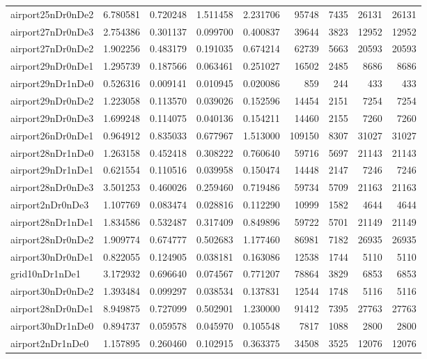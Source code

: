 \documentclass[../../../thesis.tex]{subfiles}
\begin{document}
\begin{longtable}{|l|r|r|r|r|r|r|r|r|}
airport25nDr0nDe2 & 6.780581 & 0.720248 & 1.511458 & 2.231706 & 95748 & 7435 & 26131 & 26131 \\
airport27nDr0nDe3 & 2.754386 & 0.301137 & 0.099700 & 0.400837 & 39644 & 3823 & 12952 & 12952 \\
airport27nDr0nDe2 & 1.902256 & 0.483179 & 0.191035 & 0.674214 & 62739 & 5663 & 20593 & 20593 \\
airport29nDr0nDe1 & 1.295739 & 0.187566 & 0.063461 & 0.251027 & 16502 & 2485 & 8686 & 8686 \\
airport29nDr1nDe0 & 0.526316 & 0.009141 & 0.010945 & 0.020086 & 859 & 244 & 433 & 433 \\
airport29nDr0nDe2 & 1.223058 & 0.113570 & 0.039026 & 0.152596 & 14454 & 2151 & 7254 & 7254 \\
airport29nDr0nDe3 & 1.699248 & 0.114075 & 0.040136 & 0.154211 & 14460 & 2155 & 7260 & 7260 \\
airport26nDr0nDe1 & 0.964912 & 0.835033 & 0.677967 & 1.513000 & 109150 & 8307 & 31027 & 31027 \\
airport28nDr1nDe0 & 1.263158 & 0.452418 & 0.308222 & 0.760640 & 59716 & 5697 & 21143 & 21143 \\
airport29nDr1nDe1 & 0.621554 & 0.110516 & 0.039958 & 0.150474 & 14448 & 2147 & 7246 & 7246 \\
airport28nDr0nDe3 & 3.501253 & 0.460026 & 0.259460 & 0.719486 & 59734 & 5709 & 21163 & 21163 \\
airport2nDr0nDe3 & 1.107769 & 0.083474 & 0.028816 & 0.112290 & 10999 & 1582 & 4644 & 4644 \\
airport28nDr1nDe1 & 1.834586 & 0.532487 & 0.317409 & 0.849896 & 59722 & 5701 & 21149 & 21149 \\
airport28nDr0nDe2 & 1.909774 & 0.674777 & 0.502683 & 1.177460 & 86981 & 7182 & 26935 & 26935 \\
airport30nDr0nDe1 & 0.822055 & 0.124905 & 0.038181 & 0.163086 & 12538 & 1744 & 5110 & 5110 \\
grid10nDr1nDe1 & 3.172932 & 0.696640 & 0.074567 & 0.771207 & 78864 & 3829 & 6853 & 6853 \\
airport30nDr0nDe2 & 1.393484 & 0.099297 & 0.038534 & 0.137831 & 12544 & 1748 & 5116 & 5116 \\
airport28nDr0nDe1 & 8.949875 & 0.727099 & 0.502901 & 1.230000 & 91412 & 7395 & 27763 & 27763 \\
airport30nDr1nDe0 & 0.894737 & 0.059578 & 0.045970 & 0.105548 & 7817 & 1088 & 2800 & 2800 \\
airport2nDr1nDe0 & 1.157895 & 0.260460 & 0.102915 & 0.363375 & 34508 & 3525 & 12076 & 12076 \\

\end{longtable}
\end{document}
